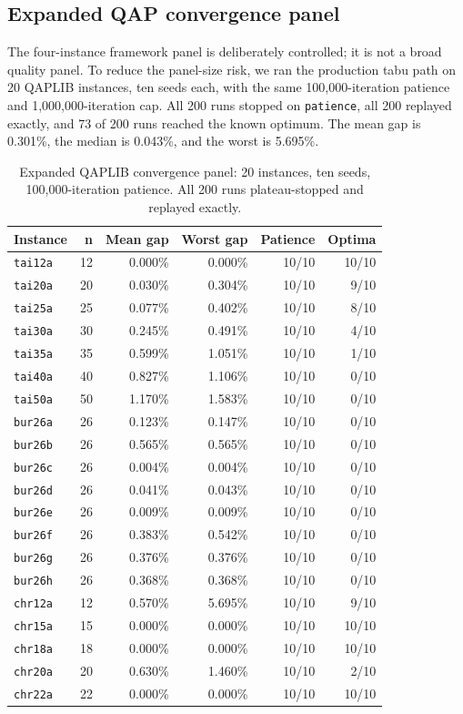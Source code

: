 \documentclass[pdflatex,sn-mathphys-num]{sn-jnl}
\begin{document}
\subsection{Expanded QAP convergence panel}

The four-instance framework panel is deliberately controlled; it is not a broad quality panel. To
reduce the panel-size risk, we ran the production tabu path on 20 QAPLIB instances, ten seeds each,
with the same 100,000-iteration patience and 1,000,000-iteration cap. All 200 runs stopped on
\texttt{patience}, all 200 replayed exactly, and 73 of 200 runs reached the known optimum. The mean
gap is 0.301\%, the median is 0.043\%, and the worst is 5.695\%.

\begin{table}[t]
\centering
\caption{Expanded QAPLIB convergence panel: 20 instances, ten seeds, 100,000-iteration patience.
All 200 runs plateau-stopped and replayed exactly.}
\label{tab:qap-expanded}
\small
\begin{tabular}{lrrrrr}
\toprule
Instance & n & Mean gap & Worst gap & Patience & Optima \\
\midrule
\texttt{tai12a} & 12 & 0.000\% & 0.000\% & 10/10 & 10/10 \\
\texttt{tai20a} & 20 & 0.030\% & 0.304\% & 10/10 & 9/10 \\
\texttt{tai25a} & 25 & 0.077\% & 0.402\% & 10/10 & 8/10 \\
\texttt{tai30a} & 30 & 0.245\% & 0.491\% & 10/10 & 4/10 \\
\texttt{tai35a} & 35 & 0.599\% & 1.051\% & 10/10 & 1/10 \\
\texttt{tai40a} & 40 & 0.827\% & 1.106\% & 10/10 & 0/10 \\
\texttt{tai50a} & 50 & 1.170\% & 1.583\% & 10/10 & 0/10 \\
\texttt{bur26a} & 26 & 0.123\% & 0.147\% & 10/10 & 0/10 \\
\texttt{bur26b} & 26 & 0.565\% & 0.565\% & 10/10 & 0/10 \\
\texttt{bur26c} & 26 & 0.004\% & 0.004\% & 10/10 & 0/10 \\
\texttt{bur26d} & 26 & 0.041\% & 0.043\% & 10/10 & 0/10 \\
\texttt{bur26e} & 26 & 0.009\% & 0.009\% & 10/10 & 0/10 \\
\texttt{bur26f} & 26 & 0.383\% & 0.542\% & 10/10 & 0/10 \\
\texttt{bur26g} & 26 & 0.376\% & 0.376\% & 10/10 & 0/10 \\
\texttt{bur26h} & 26 & 0.368\% & 0.368\% & 10/10 & 0/10 \\
\texttt{chr12a} & 12 & 0.570\% & 5.695\% & 10/10 & 9/10 \\
\texttt{chr15a} & 15 & 0.000\% & 0.000\% & 10/10 & 10/10 \\
\texttt{chr18a} & 18 & 0.000\% & 0.000\% & 10/10 & 10/10 \\
\texttt{chr20a} & 20 & 0.630\% & 1.460\% & 10/10 & 2/10 \\
\texttt{chr22a} & 22 & 0.000\% & 0.000\% & 10/10 & 10/10 \\
\bottomrule
\end{tabular}
\end{table}
\end{document}
